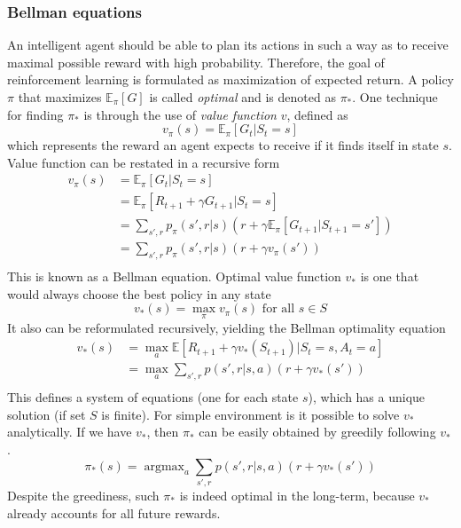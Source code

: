 \documentclass[12pt]{article}
\DeclareMathOperator*{\argmax}{argmax}
\begin{document}
\subsubsection{Bellman equations}
An intelligent agent should be able to plan its actions in such a way as to receive maximal possible reward with high probability. Therefore, the goal of reinforcement learning is formulated as maximization of expected return. A policy $\pi$ that maximizes $\mathbb{E}_\pi [G]$ is called \textit{optimal} and is denoted as $\pi_*$. One technique for finding $\pi_*$ is through the use of \textit{value function} $v$, defined as 
\[
v_\pi(s) = \mathbb{E}_\pi [G_t|S_t=s]
\]
which represents the reward an agent expects to receive if it finds itself in state $s$. Value function can be restated in a recursive form
\begin{equation}
	\begin{split}
		v_\pi(s) & = \mathbb{E}_\pi [G_t|S_t=s] \\
		& = \mathbb{E}_\pi [R_{t+1}+\gamma G_{t+1}|S_t=s] \\
		& = \sum_{s',r} p_\pi(s',r|s)(r+\gamma \mathbb{E}_\pi [G_{t+1}|S_{t+1}=s']) \\
		& = \sum_{s',r} p_\pi(s',r|s)(r+\gamma v_\pi(s')) \\
	\end{split}
\end{equation}
This is known as a Bellman equation. 
Optimal value function $v_*$ is one that would always choose the best policy in any state
\[
v_*(s) = \max_\pi v_\pi(s)\text{ for all }s\in S
\]
It also can be reformulated recursively, yielding the Bellman optimality equation
\begin{equation}
	\begin{split}
v_*(s) & = \max_a \mathbb{E}[R_{t+1}+\gamma v_*(S_{t+1})|S_t=s,A_t=a] \\
		& = \max_a  \sum_{s',r} p(s',r|s,a)(r+\gamma v_*(s')) \\
	\end{split}
\end{equation}
This defines a system of equations (one for each state $s$), which has a unique solution (if set $S$ is finite). For simple environment is it possible to solve $v_*$ analytically. If we have $v_*$, then $\pi_*$  can be easily obtained by greedily following $v_*$.
\[
\pi_*(s) = \argmax_a \sum_{s',r} p(s',r|s,a)(r+\gamma v_*(s')) 
\]
Despite the greediness, such $\pi_*$ is indeed  optimal in the long-term, because $v_*$ already accounts for all future rewards.
\end{document}
